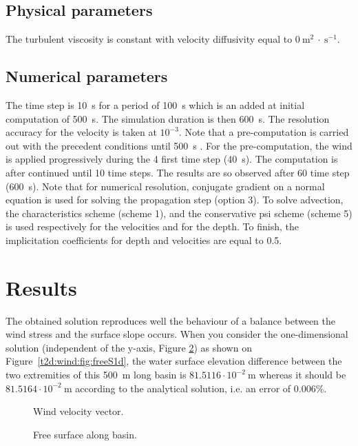 \subsection{Physical parameters}

The turbulent viscosity is constant with velocity 
diffusivity equal to $0~\text{m}^2~\cdot~\text{s}^{-1}$.

\subsection{Numerical parameters}

The time step is 10~s for a period of 100~s which is an added at initial computation 
of 500~s. The simulation duration is then 600~s. The resolution accuracy for the 
velocity is taken at $10^{-3}$.
Note that a pre-computation is carried out with the precedent conditions until 500~s .
 For the pre-computation, the wind is applied progressively during 
the 4 first time step (40~s). 
The computation is after continued until 10 time steps. 
The results are so observed after 60 time step (600~s). 
Note that for numerical resolution, conjugate gradient on a normal equation 
is used for solving the propagation step (option 3). To solve advection, 
the characteristics scheme (scheme 1), and the conservative psi scheme (scheme 5) 
is used respectively for the velocities and for the depth. To finish, the implicitation 
coefficients for depth and velocities are equal to 0.5.\\

\section{Results}

The obtained  solution reproduces well the behaviour of a balance 
between the wind stress and the surface slope occurs. 
When you consider the one-dimensional solution (independent of the y-axis, 
Figure \ref{t2d:wind:fig:freeSbasin}) as shown on Figure~\ref{t2d:wind:fig:freeS1d}, 
the water surface elevation difference between 
the two extremities of this 500~m long basin is $81.5116\cdot 10^{-2}~\text{m}$ 
whereas it should be $81.5164\cdot 10^{-2}~\text{m}$ according to the analytical 
solution, i.e. an error of 0.006\%. %

\begin{figure}[H]
 \centering
 \caption{Wind velocity vector.}
 \label{t2d:wind:fig:windvelo}
\end{figure}
\begin{figure}[H]
 \centering
 \caption{Free surface along basin.}
 \label{t2d:wind:fig:freeSbasin}
\end{figure}

